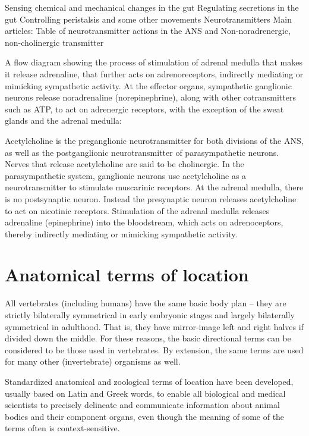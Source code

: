\documentclass[]{book}
\begin{document}
Sensing chemical and mechanical changes in the gut
Regulating secretions in the gut
Controlling peristalsis and some other movements
Neurotransmitters
Main articles: Table of neurotransmitter actions in the ANS and Non-noradrenergic, non-cholinergic transmitter

A flow diagram showing the process of stimulation of adrenal medulla that makes it release adrenaline, that further acts on adrenoreceptors, indirectly mediating or mimicking sympathetic activity.
At the effector organs, sympathetic ganglionic neurons release noradrenaline (norepinephrine), along with other cotransmitters such as ATP, to act on adrenergic receptors, with the exception of the sweat glands and the adrenal medulla:

Acetylcholine is the preganglionic neurotransmitter for both divisions of the ANS, as well as the postganglionic neurotransmitter of parasympathetic neurons. Nerves that release acetylcholine are said to be cholinergic. In the parasympathetic system, ganglionic neurons use acetylcholine as a neurotransmitter to stimulate muscarinic receptors.
At the adrenal medulla, there is no postsynaptic neuron. Instead the presynaptic neuron releases acetylcholine to act on nicotinic receptors. Stimulation of the adrenal medulla releases adrenaline (epinephrine) into the bloodstream, which acts on adrenoceptors, thereby indirectly mediating or mimicking sympathetic activity.

\hypertarget{appendix-appendix}{%
\appendix}


\hypertarget{anatomical-terms-of-location}{%
\chapter{Anatomical terms of location}\label{anatomical-terms-of-location}}

All vertebrates (including humans) have the same basic body plan -- they are strictly bilaterally symmetrical in early embryonic stages and largely bilaterally symmetrical in adulthood. That is, they have mirror-image left and right halves if divided down the middle. For these reasons, the basic directional terms can be considered to be those used in vertebrates. By extension, the same terms are used for many other (invertebrate) organisms as well.

Standardized anatomical and zoological terms of location have been developed, usually based on Latin and Greek words, to enable all biological and medical scientists to precisely delineate and communicate information about animal bodies and their component organs, even though the meaning of some of the terms often is context-sensitive.
\end{document}
